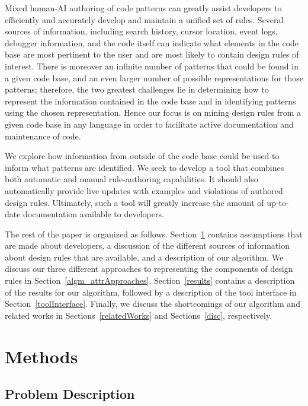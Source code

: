 \documentclass[12pt]{article}
\begin{document}
Mixed human-AI authoring of code patterns can greatly assist developers to efficiently and accurately develop and maintain a unified set of rules. Several sources of information, including search history, cursor location, event logs, debugger information, and the code itself can indicate what elements in the code base are most pertinent to the user and are most likely to contain design rules of interest. There is moreover an infinite number of patterns that could be found in a given code base, and an even larger number of possible representations for those patterns; therefore, the two greatest challenges lie in determining how to represent the information contained in the code base and in identifying patterns using the chosen representation. Hence our focus is on mining design rules from a given code base in any language in order to facilitate active documentation and maintenance of code.

We explore how information from outside of the code base could be used to inform what patterns are identified. We seek to develop a tool that combines both automatic and manual rule-authoring capabilities. It should also automatically provide live updates with examples and violations of authored design rules. Ultimately, such a tool will greatly increase the amount of up-to-date documentation available to developers.

The rest of the paper is organized as follows. Section~\ref{methods} contains assumptions that are made about developers, a discussion of the different sources of information about design rules that are available, and a description of our algorithm. We discuss our three different approaches to representing the components of design rules in Section~\ref{algm_attrApproaches}. Section~\ref{results} contains a description of the results for our algorithm, followed by a description of the tool interface in Section~\ref{toolInterface}. Finally, we discuss the shortcomings of our algorithm and related works in Sections~\ref{relatedWorks} and Sections~\ref{disc}, respectively.
 
 
 \clearpage


\section{Methods}\label{methods}

\subsection{Problem Description} \label{probDesc}
\end{document}
